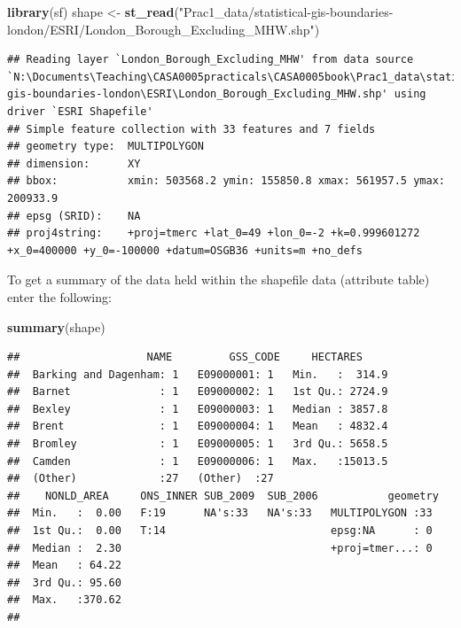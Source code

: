 \documentclass[]{book}
\newenvironment{Shaded}{\begin{snugshade}}{\end{snugshade}}
\newcommand{\KeywordTok}[1]{\textcolor[rgb]{0.13,0.29,0.53}{\textbf{#1}}}
\newcommand{\NormalTok}[1]{#1}
\newcommand{\StringTok}[1]{\textcolor[rgb]{0.31,0.60,0.02}{#1}}
\begin{document}
\begin{Shaded}
\begin{Highlighting}[]
\KeywordTok{library}\NormalTok{(sf)}
\NormalTok{shape <-}\StringTok{ }\KeywordTok{st_read}\NormalTok{(}\StringTok{"Prac1_data/statistical-gis-boundaries-london/ESRI/London_Borough_Excluding_MHW.shp"}\NormalTok{)}
\end{Highlighting}
\end{Shaded}

\begin{verbatim}
## Reading layer `London_Borough_Excluding_MHW' from data source `N:\Documents\Teaching\CASA0005practicals\CASA0005book\Prac1_data\statistical-gis-boundaries-london\ESRI\London_Borough_Excluding_MHW.shp' using driver `ESRI Shapefile'
## Simple feature collection with 33 features and 7 fields
## geometry type:  MULTIPOLYGON
## dimension:      XY
## bbox:           xmin: 503568.2 ymin: 155850.8 xmax: 561957.5 ymax: 200933.9
## epsg (SRID):    NA
## proj4string:    +proj=tmerc +lat_0=49 +lon_0=-2 +k=0.999601272 +x_0=400000 +y_0=-100000 +datum=OSGB36 +units=m +no_defs
\end{verbatim}

To get a summary of the data held within the shapefile data (attribute table) enter the following:

\begin{Shaded}
\begin{Highlighting}[]
\KeywordTok{summary}\NormalTok{(shape)}
\end{Highlighting}
\end{Shaded}

\begin{verbatim}
##                    NAME         GSS_CODE     HECTARES      
##  Barking and Dagenham: 1   E09000001: 1   Min.   :  314.9  
##  Barnet              : 1   E09000002: 1   1st Qu.: 2724.9  
##  Bexley              : 1   E09000003: 1   Median : 3857.8  
##  Brent               : 1   E09000004: 1   Mean   : 4832.4  
##  Bromley             : 1   E09000005: 1   3rd Qu.: 5658.5  
##  Camden              : 1   E09000006: 1   Max.   :15013.5  
##  (Other)             :27   (Other)  :27                    
##    NONLD_AREA     ONS_INNER SUB_2009  SUB_2006           geometry 
##  Min.   :  0.00   F:19      NA's:33   NA's:33   MULTIPOLYGON :33  
##  1st Qu.:  0.00   T:14                          epsg:NA      : 0  
##  Median :  2.30                                 +proj=tmer...: 0  
##  Mean   : 64.22                                                   
##  3rd Qu.: 95.60                                                   
##  Max.   :370.62                                                   
## 
\end{verbatim}
\end{document}
